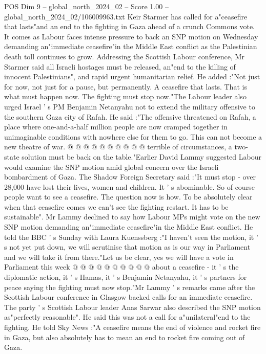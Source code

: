 \begin{textsample}{POS Dim 9 – global\_north\_2024\_02 – Score 1.00 – global\_north\_2024\_02/106009963.txt}  \label{ex:f9_pos_219}
Keir Starmer has called for a"ceasefire that lasts"and an end to the fighting in Gaza ahead of a crunch Commons vote.
It comes as Labour faces intense pressure to back an SNP motion on Wednesday demanding an"immediate ceasefire"in the Middle East conflict as the Palestinian death toll continues to grow.
Addressing the Scottish Labour conference, Mr Starmer said all Israeli hostages must be released, an"end to the killing of innocent Palestinians", and rapid urgent humanitarian relief.
He added :"Not just for now, not just for a pause, but permanently.
A ceasefire that lasts.
That is what must happen now.
The fighting must stop now."The Labour leader also urged Israel ' s PM Benjamin Netanyahu not to extend the military offensive to the southern Gaza city of Rafah.
He said :"The offensive threatened on Rafah, a place where one-and-a-half million people are now cramped together in unimaginable conditions with nowhere else for them to go.
This can not become a new theatre of war. @ @ @ @ @ @ @ @ @ @ terrible of circumstances, a two-state solution must be back on the table."Earlier David Lammy suggested Labour would examine the SNP motion amid global concern over the Israeli bombardment of Gaza.
The Shadow Foreign Secretary said :"It must stop - over 28,000 have lost their lives, women and children.
It ' s abominable.
So of course people want to see a ceasefire.
The question now is how.
To be absolutely clear when that ceasefire comes we can't see the fighting restart.
It has to be sustainable".
Mr Lammy declined to say how Labour MPs might vote on the new SNP motion demanding an"immediate ceasefire"in the Middle East conflict.
He told the BBC ' s Sunday with Laura Kuenssberg :"I haven't seen the motion, it ' s not yet put down, we will scrutinise that motion as is our way in Parliament and we will take it from there."Let us be clear, yes we will have a vote in Parliament this week @ @ @ @ @ @ @ @ @ @ about a ceasefire - it ' s the diplomatic action, it ' s Hamas, it ' s Benjamin Netanyahu, it ' s partners for peace saying the fighting must now stop."Mr Lammy ' s remarks came after the Scottish Labour conference in Glasgow backed calls for an immediate ceasefire.
The party ' s Scottish Labour leader Anas Sarwar also described the SNP motion as"perfectly reasonable".
He said this was not a call for a"unilateral"end to the fighting.
He told Sky News :"A ceasefire means the end of violence and rocket fire in Gaza, but also absolutely has to mean an end to rocket fire coming out of Gaza.

\end{textsample}
